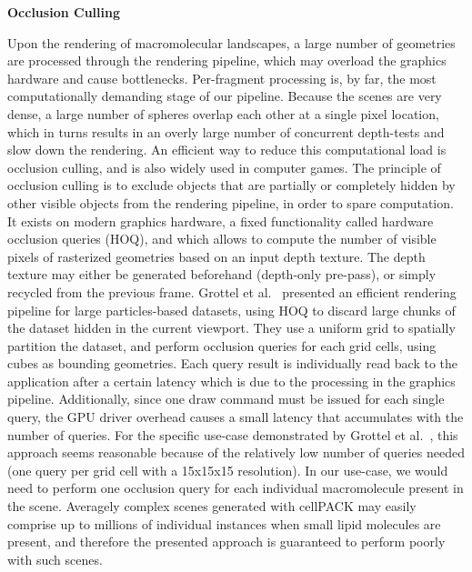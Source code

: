 \textbf{Occlusion Culling}


Upon the rendering of macromolecular landscapes, a large number of geometries are processed through the rendering pipeline, which may overload the graphics hardware and cause bottlenecks.
Per-fragment processing is, by far, the most computationally demanding stage of our pipeline.
Because the scenes are very dense, a large number of spheres overlap each other at a single pixel location, which in turns results in an overly large number of concurrent depth-tests and slow down the rendering.
An efficient way to reduce this computational load is occlusion culling, and is also widely used in computer games.
The principle of occlusion culling is to exclude objects that are partially or completely hidden by other visible objects from the rendering pipeline, in order to spare computation.
It exists on modern graphics hardware, a fixed functionality called hardware occlusion queries (HOQ), and which allows to compute the number of visible pixels of rasterized geometries based on an input depth texture.
The depth texture may either be generated beforehand (depth-only pre-pass), or simply recycled from the previous frame.
Grottel et al.~\cite{grottel2010coherent} presented an efficient rendering pipeline for large particles-based datasets, using HOQ to discard large chunks of the dataset hidden in the current viewport.
They use a uniform grid to spatially partition the dataset, and perform occlusion queries for each grid cells, using cubes as bounding geometries.
Each query result is individually read back to the application after a certain latency which is due to the processing in the graphics pipeline.
Additionally, since one draw command must be issued for each single query, the GPU driver overhead causes a small latency that accumulates with the number of queries.
For the specific use-case demonstrated by Grottel et al.~\cite{grottel2010coherent}, this approach seems reasonable because of the relatively low number of queries needed (one query per grid cell with a 15x15x15 resolution).
In our use-case, we would need to perform one occlusion query for each individual macromolecule present in the scene.
Averagely complex scenes generated with cellPACK may easily comprise up to millions of individual instances when small lipid molecules are present, and therefore the presented approach is guaranteed to perform poorly with such scenes.

